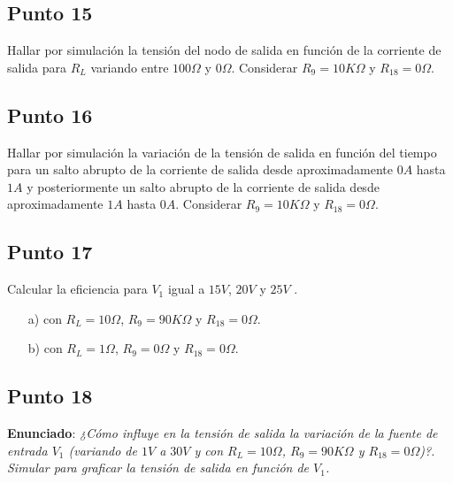 \clearpage

\subsection{Punto 15}

Hallar por simulación la tensión del nodo de salida en función de la corriente de salida para  $R_{L}$ variando entre  $100 \Omega$ y $0 \Omega$. Considerar $R_{9} = 10 K\Omega$ y $R_{18} = 0 \Omega$.

\clearpage

\subsection{Punto 16}

Hallar por simulación la variación de la tensión de salida en función del tiempo para un salto abrupto de la corriente de salida desde aproximadamente $0 A$ hasta $ 1A$ y posteriormente un salto abrupto de la corriente de salida desde aproximadamente $ 1A$ hasta $0 A$. Considerar $R_{9} = 10 K\Omega$ y $R_{18} = 0 \Omega$.

\clearpage


\subsection{Punto 17}

Calcular la eficiencia para $V_{1}$ igual a $15 V$, $20 V$ y $25 V$ .

\begin{enumerate}
\item[a)] con $R_{L} = 10 \Omega$, $R_{9} = 90 K\Omega$ y $R_{18} = 0 \Omega$.
\item[b)] con $R_{L} = 1 \Omega$, $R_{9} = 0 \Omega$ y $R_{18} = 0 \Omega$.
\end{enumerate}


\clearpage

\subsection{Punto 18}

\textbf{Enunciado}: \textsl{¿Cómo influye en la tensión de salida la variación de la fuente de entrada $V_{1}$ (variando de $1 V$ a $30 V$ y con $R_{L} = 10 \Omega$, $R_{9} = 90 K\Omega$ y $R_{18} = 0 \Omega$)?. Simular para graficar la tensión de salida en función de $V_{1}$.}\\





